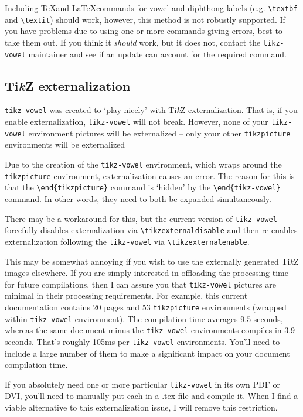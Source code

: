 \documentclass{article}
\newcommand{\pkg}[1]{\texttt{#1}}
\newcommand{\TikZ}{Ti\textit{k}Z\xspace}
\begin{document}
Including \TeX and \LaTeX commands for vowel and diphthong labels (e.g. \verb|\textbf| and \verb|\textit|) should work, however, this method is not robustly supported.  If you have problems due to using one or more commands giving errors, best to take them out.  If you think it \textit{should} work, but it does not, contact the \pkg{tikz-vowel} maintainer and see if an update can account for the required command.

\subsection{\TikZ externalization}
\label{sec:TikZ externalization}

\pkg{tikz-vowel} was created to `play nicely' with \TikZ externalization.  That is, if you enable externalization, \pkg{tikz-vowel} will not break.  However, none of your \verb|tikz-vowel| environment pictures will be externalized -- only your other \verb|tikzpicture| environments will be externalized

Due to the creation of the \verb|tikz-vowel| environment, which wraps around the \verb|tikzpicture| environment, externalization causes an error.  The reason for this is that the \verb|\end{tikzpicture}| command is `hidden' by the \verb|\end{tikz-vowel}| command.  In other words, they need to both be expanded simultaneously.

There may be a workaround for this, but the current version of \pkg{tikz-vowel} forcefully disables externalization via \verb|\tikzexternaldisable| and then re-enables externalization following the \verb|tikz-vowel| via \verb|\tikzexternalenable|.

This may be somewhat annoying if you wish to use the externally generated \TikZ images elsewhere.  If you are simply interested in offloading the processing time for future compilations, then I can assure you that \verb|tikz-vowel| pictures are minimal in their processing requirements.  For example, this current documentation contains 20 pages and 53 \verb|tikzpicture| environments (wrapped within \verb|tikz-vowel| environment).  The compilation time averages 9.5 seconds, whereas the same document minus the \verb|tikz-vowel| environments compiles in 3.9 seconds.  That's roughly 105ms per \verb|tikz-vowel| environments.  You'll need to include a large number of them to make a significant impact on your document compilation time.

If you absolutely need one or more particular \verb|tikz-vowel| in its own PDF or DVI, you'll need to manually put each in a .tex file and compile it.  When I find a viable alternative to this externalization issue, I will remove this restriction.
\end{document}
